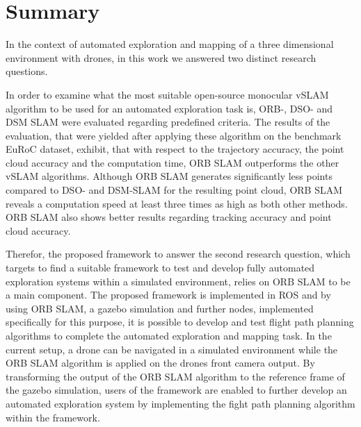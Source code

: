 \chapter{Summary}

In the context of automated exploration and mapping of a three dimensional environment with drones, in this work we answered two distinct research questions.
 
In order to examine what the most suitable open-source monocular vSLAM algorithm to be used for an automated exploration task is, ORB-, DSO- and DSM SLAM were evaluated regarding predefined criteria. The results of the evaluation, that were yielded after applying these algorithm on the benchmark EuRoC dataset, exhibit, that with respect to the trajectory accuracy, the point cloud accuracy and the computation time, ORB SLAM outperforms the other vSLAM algorithms. Although ORB SLAM generates significantly less points compared to DSO- and DSM-SLAM for the resulting point cloud, ORB SLAM reveals a computation speed at least three times as high as both other methods. ORB SLAM also shows better results regarding tracking accuracy and point cloud accuracy. 

Therefor, the proposed framework to answer the second research question, which targets to find a suitable framework to test and develop fully automated exploration systems within a simulated environment, relies on ORB SLAM to be a main component. The proposed framework is implemented in ROS and by using ORB SLAM, a gazebo simulation and further nodes, implemented specifically for this purpose, it is possible to develop and test flight path planning algorithms to complete the automated exploration and mapping task. In the current setup, a drone can be navigated in a simulated environment while the ORB SLAM algorithm is applied on the drones front camera output. By transforming the output of the ORB SLAM algorithm to the reference frame of the gazebo simulation, users of the framework are enabled to further develop an automated exploration system by implementing the fight path planning algorithm within the framework. 